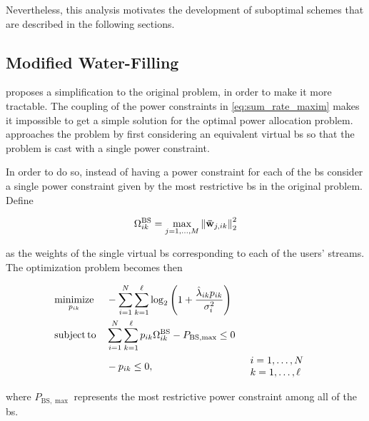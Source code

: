 Nevertheless, this analysis motivates the development of suboptimal schemes that are described in the following sections.

\subsection{Modified Water-Filling}\label{ssec:modified_wf}

\cite{armada11b} proposes a simplification to the original problem, in order to
make it more tractable. The coupling of the power constraints in
\eqref{eq:sum_rate_maxim} makes it impossible to get a simple solution for the
optimal power allocation problem. \cite{armada11b} approaches the problem by
first considering an equivalent virtual \gls{bs} so that the problem is cast
with a single power constraint.

In order to do so, instead of having a power constraint for each of the \gls{bs}
consider a single power constraint given by the most restrictive \gls{bs} in the
original problem. Define

\begin{equation} \label{eq:equiv_bs}
    \Omega_{ik}^{\text{BS}} = \max\limits_{j=1, \ldots,M} \left\|\mathbf{\bar{w}}_{j,ik} \right\|_2^2
\end{equation}

\noindent
as the weights of the single virtual \gls{bs} corresponding to each of the
users' streams. The optimization problem becomes then

\begin{equation} \label{eq:optim_modif_wf}
\begin{aligned}
	&\operatorname*{minimize}\limits_{p_{ik}} &&-\sum\limits_{i = 1}^N
	\sum\limits_{k = 1}^\ell \log_2\left( 1 +
	\frac{\hat{\lambda}_{ik} p_{ik}}{\sigma_i^2} \right)\\
	&\operatorname*{subject\,to} &&\sum\limits_{i = 1}^N \sum\limits_{k = 1}^\ell p_{ik} \Omega_{ik}^{\text{BS}} -
    P_{\text{BS},\max} \leq 0\\
    & &&-p_{ik} \leq 0, &&
	\begin{array}{l}
	i = 1, \ldots, N\\
	k = 1, \ldots, \ell
	\end{array}
\end{aligned}
\end{equation}

\noindent
where $P_{\text{BS}, \max}$ represents the most restrictive power constraint
among all of the \gls{bs}.

